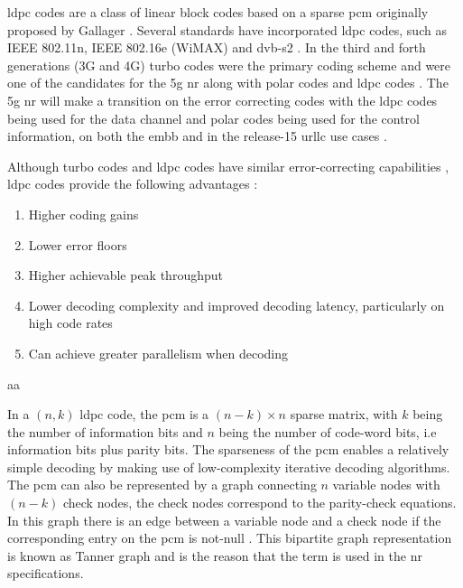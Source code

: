 \Gls{ldpc} codes are a class of linear block codes based on a sparse \gls{pcm}  originally proposed by Gallager \cite{gallager1962}.
%
Several standards have incorporated \gls{ldpc} codes, such as IEEE 802.11n, IEEE 802.16e (WiMAX) and \gls{dvb-s2} \cite{AliZaidi632018}.
%
In the third and forth generations (3G and 4G) turbo codes were the primary coding scheme \cite{Richardson2018} and were one of the candidates for the \gls{5g} \gls{nr} along with polar codes and \gls{ldpc} codes \cite{Hamidi8417496}.
%
The \gls{5g} \gls{nr} will make a transition on the error correcting codes with the \gls{ldpc} codes being used for the data channel and polar codes being used for the control information, on both the \gls{embb} and in the release-15 \gls{urllc} use cases \cite{bae_abotabl_lin_song_lee_2019}.

Although turbo codes and \gls{ldpc} codes have similar error-correcting capabilities \cite{ErikDahlman5G}, \gls{ldpc} codes provide the following advantages \cite{Hui2018}:

\begin{enumerate}
    \item Higher coding gains
    \item Lower error floors
    \item Higher achievable peak throughput
    \item Lower decoding complexity and improved decoding latency, particularly on high code rates
    \item Can achieve greater parallelism when decoding
\end{enumerate}
aa

In a $(n, k)$ \gls{ldpc} code, the \gls{pcm} is a $ (n-k) \times n$ sparse matrix, with $k$ being the number of information bits and $n$ being the number of code-word bits, i.e information bits plus parity bits.
%
The sparseness of the \gls{pcm} enables a relatively simple decoding by making use of low-complexity iterative decoding algorithms.
%
The \gls{pcm} can also be represented by a graph connecting $n$ variable nodes with $(n-k)$ check nodes, the check nodes correspond to the parity-check equations.
%
In this graph there is an edge between a variable node and a check node if the corresponding entry on the \gls{pcm} is not-null \cite{Richardson2018}.
%
This bipartite graph representation is known as Tanner graph \cite{TannerGraph} and is the reason that the term  is used in the \gls{nr} specifications.
%





